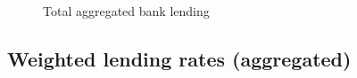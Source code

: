 \documentclass[
  letterpaper,
  DIV=11,
  numbers=noendperiod]{scrartcl}
\begin{document}
\begin{figure}[H]


\caption{\label{fig-bank_lending}Total aggregated bank lending}

\end{figure}%

\subsection{Weighted lending rates
(aggregated)}\label{weighted-lending-rates-aggregated}
\end{document}
